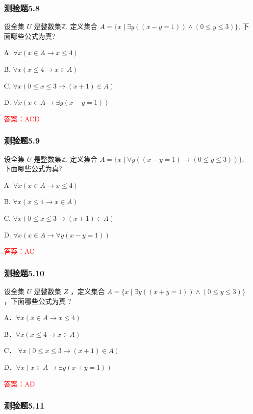 \documentclass[UTF8, heading=true]{ctexart}
\begin{document}
\subsubsection{测验题5.8}
设全集 $U$ 是整数集$\mathbb{Z}$, 定义集合 $A=\{x \mid \exists y((x-y=1)) \wedge(0 \leq y \leq 3)\}$, 下面哪些公式为真?

A. $\forall x(x \in A \rightarrow x \leq 4)$

B. $\forall x(x \leq 4 \rightarrow x \in A)$

C. $\forall x(0 \leq x \leq 3 \rightarrow(x+1) \in A)$

D. $\forall x(x \in A \rightarrow \exists y(x-y=1))$

\textcolor{red}{答案：ACD}

\subsubsection{测验题5.9}

设全集 $U$ 是整数集$\mathbb{Z}$, 定义集合 $A=\{x \mid \forall y((x-y=1) \rightarrow(0 \leq y \leq 3))\}$, 下面哪些公式为真?

A. $\forall x(x \in A \rightarrow x \leq 4)$

B. $\forall x(x \leq 4 \rightarrow x \in A)$

C. $\forall x(0 \leq x \leq 3 \rightarrow(x+1) \in A)$

D. $\forall x(x \in A \rightarrow \forall y(x-y=1))$

\textcolor{red}{答案：AC}

\subsubsection{测验题5.10}

设全集 $U$ 是整数集 $Z$ ，定义集合 $A=\{x \mid \exists y((x+y=1)) \wedge(0 \leq y \leq 3)\}$ ，下面哪些公式为真 $?$

A．$\forall x(x \in A \rightarrow x \leq 4)$

B．$\forall x(x \leq 4 \rightarrow x \in A)$

C．
$\forall x(0 \leq x \leq 3 \rightarrow(x+1) \in A)$

D．$\forall x(x \in A \rightarrow \exists y(x+y=1))$

\textcolor{red}{答案：AD}



\subsubsection{测验题5.11}
\end{document}
